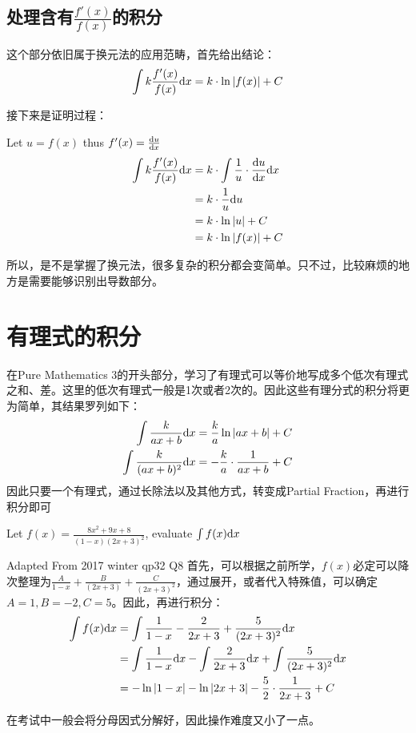\subsection*{处理含有$\frac{f'(x)}{f(x)}$的积分}
这个部分依旧属于换元法的应用范畴，首先给出结论：
\[
	\int k \frac{f'(x)}{f(x)}{\mathrm{d}} x =k\cdot \ln|f(x)|+C
\]

接下来是证明过程：
\begin{ExampleBox}
Let $u=f(x)$ thus $f'(x) =\frac{{\mathrm{d}} u}{{\mathrm{d}} x}$
\begin{align*}
 \int k \frac{f'(x)}{f(x)}{\mathrm{d}} x &=k\cdot \int \frac{1}{u}\cdot \frac{{\mathrm{d}} u}{{\mathrm{d}} x} {\mathrm{d}} x\\
 &=k\cdot \frac{1}{u} {\mathrm{d}} u\\
 &=k\cdot \ln |u|+C\\
 &=k\cdot \ln |f(x)|+C\\
\end{align*}
\end{ExampleBox}

所以，是不是掌握了换元法，很多复杂的积分都会变简单。只不过，比较麻烦的地方是需要能够识别出导数部分。
\clearpage

\section{有理式的积分}
在Pure Mathematics 3的开头部分，学习了有理式可以等价地写成多个低次有理式之和、差。这里的低次有理式一般是1次或者2次的。因此这些有理分式的积分将更为简单，其结果罗列如下：
\begin{align*}
  \int \frac{k}{ax+b} {\mathrm{d}} x &=\frac{k}{a} \ln |ax+b|+C\\
  \int \frac{k}{(ax+b)^2} {\mathrm{d}} x &= -\frac{k}{a}\cdot \frac{1}{ax+b}+C\\
\end{align*}
因此只要一个有理式，通过长除法以及其他方式，转变成Partial Fraction，再进行积分即可

\begin{ExampleBox}
 Let $f(x)=\frac{8x^2+9x+8}{(1-x)(2x+3)^2}$, evaluate $\int f(x) {\mathrm{d}} x$


 \makebox{}\hfill Adapted From 2017 winter qp32 Q8 
 \tcblower
 首先，可以根据之前所学，$f(x)$必定可以降次整理为$\frac{A}{1-x} + \frac{B}{(2x+3)} +\frac{C}{(2x+3)^2}$，通过展开，或者代入特殊值，可以确定$A=1,B=-2,C=5$。因此，再进行积分：
\begin{align*}
 \int f(x){\mathrm{d}} x &=\int \frac{1}{1-x} -\frac{2}{2x+3} +\frac{5}{(2x+3)^2} {\mathrm{d}} x\\
               &=\int \frac{1}{1-x} {\mathrm{d}} x -\int \frac{2}{2x+3} {\mathrm{d}} x +\int \frac{5}{(2x+3)^2} {\mathrm{d}} x\\
               &=-\ln |1-x|-\ln |2x+3|-\frac{5}{2}\cdot\frac{1}{2x+3}+C\\
\end{align*}
\end{ExampleBox}
在考试中一般会将分母因式分解好，因此操作难度又小了一点。
\clearpage


